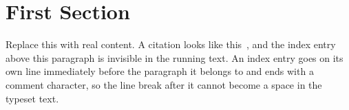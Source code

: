 \section{First Section}
\label{sec:ch01-first-section}

%
Replace this with real content. A citation looks like this~\autocite{knuth1984},
and the index entry above this paragraph is invisible in the running text. An
index entry goes on its own line immediately before the paragraph it belongs to
and ends with a comment character, so the line break after it cannot become a
space in the typeset text.

